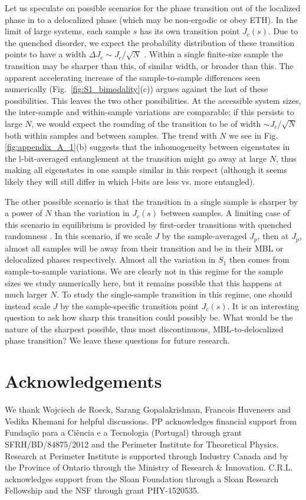 \documentclass[aps,pra,twocolumn,a4paper,showpacs,superscriptaddress,floatfix,10pt]{revtex4}
\begin{document}
Let us speculate on possible scenarios for the phase transition out of the localized phase in to a delocalized phase (which may be non-ergodic or obey ETH).
In the limit of large systems, each sample $s$ has its own transition point $J_c(s)$.
Due to the quenched disorder, we expect the probability distribution of these transition points to have a width $\Delta J_c \sim J_c/\sqrt{N}$ \cite{Chayes:1986kq,Chandran:2015aa}.
Within a single finite-size sample the transition may be sharper than this, of similar width, or broader than this.
The apparent accelerating increase of the sample-to-sample differences seen numerically (Fig.~\ref{fig:S1_bimodality}(c)) argues against the last of these possibilities.
%
This leaves the two other possibilities.
At the accessible system sizes, the inter-sample and within-sample variations are comparable; if this persists to large $N$, we would expect the rounding of the transition to be of width $\sim J_c/\sqrt{N}$ both within samples and between samples.
The trend with $N$ we see in Fig. \ref{fig:appendix_A_1}(b) suggests that the inhomogeneity between eigenstates in the l-bit-averaged entanglement at the transition might go away at large $N$, thus making all eigenstates in one sample similar in this respect (although it seems likely they will still differ in which l-bits are less vs. more entangled).

The other possible scenario is that the transition in a single sample is sharper by a power of $N$ than the variation in $J_c(s)$ between samples.
A limiting case of this scenario in equilibrium is provided by first-order transitions with quenched randomness \cite{Fisher:1995oq,Pazmandi:1997aa}.
In this scenario, if we scale $J$ by the sample-averaged $J_p$, then at $J_p$, almost all samples will be away from their transition and be in their MBL or delocalized phases respectively.
Almost all the variation in $S_1$ then comes from sample-to-sample variations.
We are clearly not in this regime for the sample sizes we study numerically here, but it remains possible that this happens at much larger $N$.
To study the single-sample transition in this regime, one should instead scale $J$ by the sample-specific transition point $J_c(s)$.
It is an interesting question to ask how sharp this transition could possibly be.  What would be the nature of the sharpest possible, thus most discontinuous, MBL-to-delocalized phase transition?  We leave these questions for future research.



\section{Acknowledgements}
We thank Wojciech de Roeck, Sarang Gopalakrishnan, Francois Huveneers and Vedika Khemani for helpful discussions.
 PP acknowledges financial support from Funda\c{c}\~ao para a
 Ci\^encia e a Tecnologia (Portugal) through grant SFRH/BD/84875/2012 and the Perimeter Institute for Theoretical Physics. Research at Perimeter
 Institute is supported through Industry Canada and by the Province of Ontario through the Ministry of Research \& Innovation.
 C.R.L. acknowledges support from the Sloan Foundation through a Sloan Research Fellowship and the NSF through grant PHY-1520535.
\appendix
\end{document}
